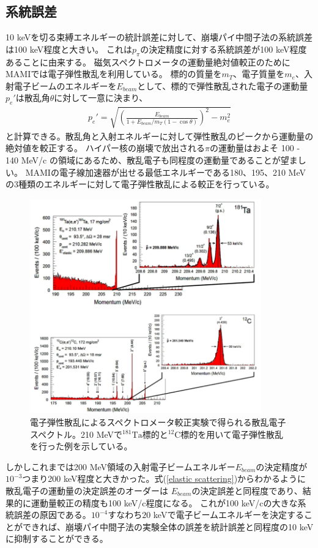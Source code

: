 \documentclass[a4paper,11pt,uplatex]{jsbook}
\begin{document}
\subsection{系統誤差}
10 keVを切る束縛エネルギーの統計誤差に対して、崩壊パイ中間子法の系統誤差は100 keV程度と大きい。
これは$p_\pi$の決定精度に対する系統誤差が100 keV程度あることに由来する。
磁気スペクトロメータの運動量絶対値較正のためにMAMIでは電子弾性散乱を利用している。
標的の質量を$m_T$、電子質量を$m_e$、入射電子ビームのエネルギーを$E_{beam}$として、標的で弾性散乱された電子の運動量$p_e'$は散乱角$\theta$に対して一意に決まり、
\begin{eqnarray}
  p_e' = \sqrt{\left(\frac{E_{beam}}{1 + E_{beam}/m_T(1 - \cos{\theta})} \right)^2 - m_e^2}\label{elastic scattering}
\end{eqnarray}
と計算できる。散乱角と入射エネルギーに対して弾性散乱のピークから運動量の絶対値を較正する。
ハイパー核の崩壊で放出される$\pi$の運動量はおよそ 100 - 140 MeV/c の領域にあるため、散乱電子も同程度の運動量であることが望ましい。
MAMIの電子線加速器が出せる最低エネルギーである180、195、210 MeVの3種類のエネルギーに対して電子弾性散乱による較正を行っている。
\begin{figure}
  \centering
  \includegraphics[width=10cm]{image/1-elastic.png}
  \caption[電子弾性散乱によるスペクトロメータ較正]{電子弾性散乱によるスペクトロメータ較正実験で得られる散乱電子スペクトル。210 MeVで$^{181}\text{Ta}$標的と$^{12}\text{C}$標的を用いて電子弾性散乱を行った例を示している。\cite{elastic}}
\end{figure}


しかしこれまでは200 MeV領域の入射電子ビームエネルギー$E_{beam}$の決定精度が$10^{-3}$つまり200 keV程度と大きかった。式(\ref{elastic scattering})からわかるように散乱電子の運動量の決定誤差のオーダーは
$E_{beam}$の決定誤差と同程度であり、結果的に運動量較正の精度も100 keV/c程度になる。
これが100 keV/cの大きな系統誤差の原因である。$10^{-4}$すなわち$20$ keVで電子ビームエネルギーを決定することができれば、崩壊パイ中間子法の実験全体の誤差を統計誤差と同程度の10 keVに抑制することができる。
\end{document}
